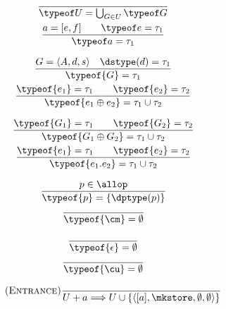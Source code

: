 \begin{figure}
\begin{minipage}{\textwidth}
  \flushright{} \\
  \begin{minipage}{0.24\textwidth}
    \begin{gather*}
    \frac{}{\typeof U = \bigcup_{G\in U} \typeof G} \\
    \frac{
        {a=[e,f]}\qquad
        {\typeof e = \tau_1}}
      {\typeof a = \tau_1}
    \end{gather*}
  \end{minipage}
  \begin{minipage}{0.24\textwidth}
    \begin{gather*}
    \frac{
        {G = \langle A,d,s\rangle}\quad
        {\dstype(d) = \tau_1}}
    {\typeof{G} = \tau_1} \\
    \frac{
        {\typeof{e_1} = \tau_1}\qquad
        {\typeof{e_2} = \tau_2}}
    {\typeof{e_1\oplus e_2} = \tau_1\cup\tau_2}
    \end{gather*}
  \end{minipage}
  \begin{minipage}{0.24\textwidth}
    \begin{gather*}
    \frac{
        {\typeof{G_1} = \tau_1}\qquad
        {\typeof{G_2} = \tau_2}}
    {\typeof{G_1\oplus G_2} = \tau_1\cup\tau_2} \\
    \frac{
        {\typeof{e_1} = \tau_1}\qquad
        {\typeof{e_2} = \tau_2}}
    {\typeof{e_1.e_2} = \tau_1\cup\tau_2}
    \end{gather*}
  \end{minipage}
  \begin{minipage}{0.12\textwidth}
    \begin{gather*}
    \frac{p \in \allop}{\typeof{p} = \{\dptype(p)\}} \\
    \frac{\quad}{\typeof{\cm} = \emptyset}
    \end{gather*}
  \end{minipage}
  \begin{minipage}{0.12\textwidth}
    \begin{gather*}
    \frac{\quad}{\typeof{\epsilon} = \emptyset} \\
    \frac{\quad}{\typeof{\cu} = \emptyset}
    \end{gather*}
  \end{minipage}
  \flushright{}
  \[
    \tag{\sc Entrance}\label{rule:birth}
    \frac{}{U + a \Longrightarrow U\cup\{\langle [a],\mkstore,\emptyset,\emptyset\rangle\}}
\]
\end{minipage}
\end{figure}
